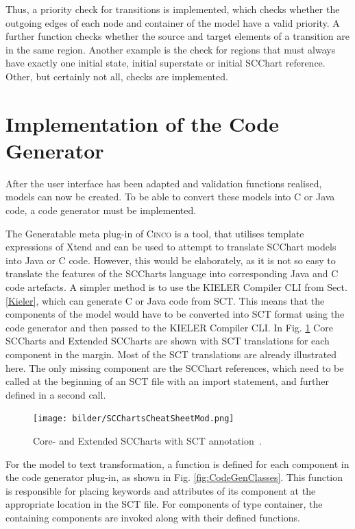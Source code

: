 Thus, a priority check for transitions is implemented, which checks whether the outgoing edges of each node and container of the model have a valid priority. A further function checks whether the source and target elements of a transition are in the same region. Another example is the check for regions that must always have exactly one initial state, initial superstate or initial SCChart reference. Other, but certainly not all, checks are implemented.


\section{Implementation of the Code Generator}
After the user interface has been adapted and validation functions realised, models can now be created. To be able to convert these models into C or Java code, a code generator must be implemented.

The Generatable meta plug-in of \textsc{Cinco} is a tool, that utilises template expressions of Xtend and can be used to attempt to translate SCChart models into Java or C code. However, this would be elaborately, as it is not so easy to translate the features of the SCCharts language into corresponding Java and C code artefacts. A simpler method is to use the KIELER Compiler CLI from Sect. \ref{Kieler}, which can generate C or Java code from SCT. This means that the components of the model would have to be converted into SCT format using the code generator and then passed to the KIELER Compiler CLI.
In Fig. \ref{fig:SCChartsCheatSheetMod} Core SCCharts and Extended SCCharts are shown with SCT translations for each component in the margin. Most of the SCT translations are already illustrated here. The only missing component are the SCChart references, which need to be called at the beginning of an SCT file with an import statement, and further defined in a second call. 

\begin{figure}[h!]
\centering
\texttt{[image: bilder/SCChartsCheatSheetMod.png]}
\caption{Core- and Extended SCCharts with SCT annotation~\cite{.06.05.2022}.}
\label{fig:SCChartsCheatSheetMod}
\end{figure} 

For the model to text transformation, a function is defined for each component in the code generator plug-in, as shown in Fig. \ref{fig:CodeGenClasses}. This function is responsible for placing keywords and attributes of its component at the appropriate location in the SCT file. For components of type container, the containing components are invoked along with their defined functions.

